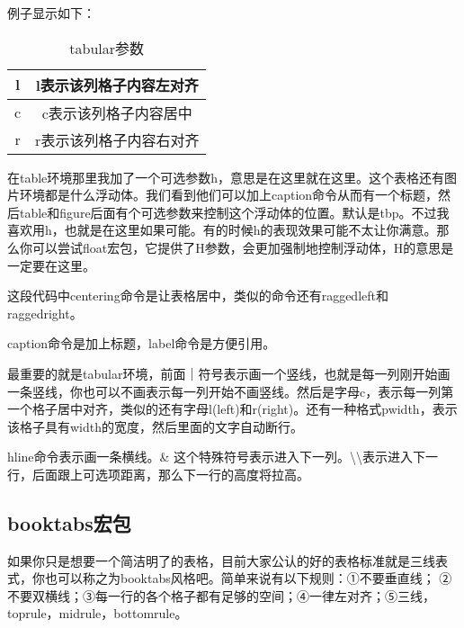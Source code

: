 例子显示如下：
\begin{table}[h]
\centering
\begin{tabular}{|c|c|}
\hline 
l & l表示该列格子内容左对齐 \\
\hline
c & c表示该列格子内容居中 \\  
\hline
r & r表示该列格子内容右对齐 \\ 
\hline
\end{tabular}
\caption{tabular参数}
\label{tab:tabular参数}
\end{table}
在table环境那里我加了一个可选参数h，意思是在这里就在这里。这个表格还有图片环境都是什么浮动体。我们看到他们可以加上caption命令从而有一个标题，然后table和figure后面有个可选参数来控制这个浮动体的位置。默认是tbp。不过我喜欢用h，也就是在这里如果可能。有的时候h的表现效果可能不太让你满意。那么你可以尝试float宏包，它提供了H参数，会更加强制地控制浮动体，H的意思是一定要在这里。

这段代码中centering命令是让表格居中，类似的命令还有raggedleft和raggedright。

caption命令是加上标题，label命令是方便引用。

最重要的就是tabular环境，前面｜符号表示画一个竖线，也就是每一列刚开始画一条竖线，你也可以不画表示每一列开始不画竖线。然后是字母c，表示每一列第一个格子居中对齐，类似的还有字母l(left)和r(right)。还有一种格式p{width}，表示该格子具有width的宽度，然后里面的文字自动断行。

hline命令表示画一条横线。\& 这个特殊符号表示进入下一列。\textbackslash \textbackslash 表示进入下一行，后面跟上可选项距离，那么下一行的高度将拉高。

\subsection{booktabs宏包}
如果你只是想要一个简洁明了的表格，目前大家公认的好的表格标准就是三线表式，你也可以称之为booktabs风格吧。简单来说有以下规则：①不要垂直线； ②不要双横线；③每一行的各个格子都有足够的空间；④一律左对齐；⑤三线，toprule，midrule，bottomrule。

